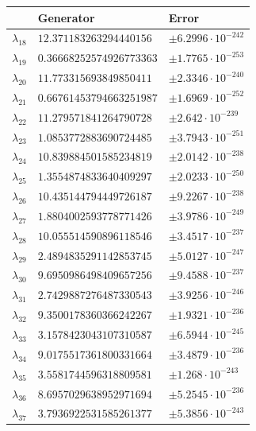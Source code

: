 \documentclass[a4paper,10pt]{article}
\begin{document}
\begin{appendix}
\begin{table}
  \centering
  \begin{tabular}{|l|ll|}
  \hline
  {}             & Generator                & Error \\
  \hline
  $\lambda_{18}$ & $12.371183263294440156$  & $\pm 6.2996 \cdot 10^{-242}$ \\
  $\lambda_{19}$ & $0.36668252574926773363$ & $\pm 1.7765 \cdot 10^{-253}$ \\
  $\lambda_{20}$ & $11.773315693849850411$  & $\pm 2.3346 \cdot 10^{-240}$ \\
  $\lambda_{21}$ & $0.66761453794663251987$ & $\pm 1.6969 \cdot 10^{-252}$ \\
  $\lambda_{22}$ & $11.279571841264790728$  & $\pm 2.642 \cdot 10^{-239}$ \\
  $\lambda_{23}$ & $1.0853772883690724485$  & $\pm 3.7943 \cdot 10^{-251}$ \\
  $\lambda_{24}$ & $10.839884501585234819$  & $\pm 2.0142 \cdot 10^{-238}$ \\
  $\lambda_{25}$ & $1.3554874833640409297$  & $\pm 2.0233 \cdot 10^{-250}$ \\
  $\lambda_{26}$ & $10.435144794449726187$  & $\pm 9.2267 \cdot 10^{-238}$ \\
  $\lambda_{27}$ & $1.8804002593778771426$  & $\pm 3.9786 \cdot 10^{-249}$ \\
  $\lambda_{28}$ & $10.055514590896118546$  & $\pm 3.4517 \cdot 10^{-237}$ \\
  $\lambda_{29}$ & $2.4894835291142853745$  & $\pm 5.0127 \cdot 10^{-247}$ \\
  $\lambda_{30}$ & $9.6950986498409657256$  & $\pm 9.4588 \cdot 10^{-237}$ \\
  $\lambda_{31}$ & $2.7429887276487330543$  & $\pm 3.9256 \cdot 10^{-246}$ \\
  $\lambda_{32}$ & $9.3500178360366242267$  & $\pm 1.9321 \cdot 10^{-236}$ \\
  $\lambda_{33}$ & $3.1578423043107310587$  & $\pm 6.5944 \cdot 10^{-245}$ \\
  $\lambda_{34}$ & $9.0175517361800331664$  & $\pm 3.4879 \cdot 10^{-236}$ \\
  $\lambda_{35}$ & $3.5581744596318809581$  & $\pm 1.268 \cdot 10^{-243}$ \\
  $\lambda_{36}$ & $8.6957029638952971694$  & $\pm 5.2545 \cdot 10^{-236}$ \\
  $\lambda_{37}$ & $3.7936922531585261377$  & $\pm 5.3856 \cdot 10^{-243}$ \\

\end{tabular}
\end{table}
\end{appendix}
\end{document}
